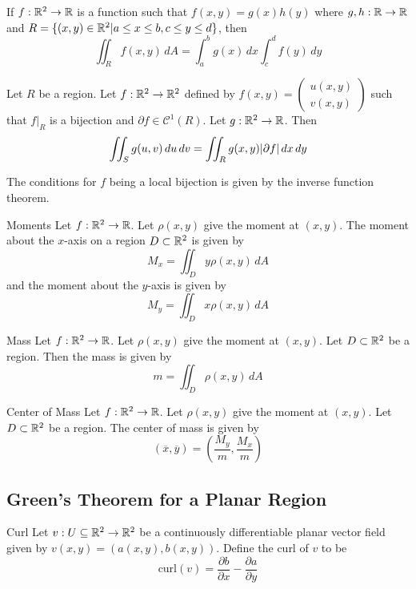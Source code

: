 \documentclass[a4paper]{article}
\begin{document}
\begin{prp}{}{} If $f:\mathbb{R}^2\to\mathbb{R}$ is a function such that $f(x,y)=g(x)h(y)$ where $g,h:\mathbb{R}\to\mathbb{R}$ and $R=\{(x,y)\in\mathbb{R}^2|a\leq x\leq b, c\leq y\leq d\}$, then $$\iint_Rf(x,y)\,dA=\int_a^bg(x)\,dx\int_c^df(y)\,dy$$
\end{prp}

\begin{thm}{}{} Let $R$ be a region. Let $f:\mathbb{R}^2\to\mathbb{R}^2$ defined by $f(x,y)=\begin{pmatrix}u(x,y)\\v(x,y)\end{pmatrix}$ such that $f|_R$ is a bijection and $\partial f\in\mathcal{C}^1(R)$. Let $g:\mathbb{R}^2\to\mathbb{R}$. Then $$\iint_Sg(u,v)\,du\,dv=\iint_Rg(x,y)\abs{\partial f}\,dx\,dy$$
\end{thm}

The conditions for $f$ being a local bijection is given by the inverse function theorem. 

\begin{thm}{Moments}{} Let $f:\mathbb{R}^2\to\mathbb{R}$. Let $\rho(x,y)$ give the moment at $(x,y)$. The moment about the $x$-axis on a region $D\subset\mathbb{R}^2$ is given by $$M_x=\iint_Dy\rho(x,y)\,dA$$ and the moment about the $y$-axis is given by $$M_y=\iint_Dx\rho(x,y)\,dA$$
\end{thm}

\begin{thm}{Mass}{} Let $f:\mathbb{R}^2\to\mathbb{R}$. Let $\rho(x,y)$ give the moment at $(x,y)$. Let $D\subset\mathbb{R}^2$ be a region. Then the mass is given by $$m=\iint_D\rho(x,y)\,dA$$
\end{thm}

\begin{thm}{Center of Mass}{} Let $f:\mathbb{R}^2\to\mathbb{R}$. Let $\rho(x,y)$ give the moment at $(x,y)$. Let $D\subset\mathbb{R}^2$ be a region. The center of mass is given by $$(\overline{x},\overline{y})=\left(\frac{M_y}{m},\frac{M_x}{m}\right)$$
\end{thm}

\subsection{Green's Theorem for a Planar Region}
\begin{defn}{Curl}{} Let $v:U\subseteq\mathbb{R}^2\to\mathbb{R}^2$ be a continuously differentiable planar vector field given by $v(x,y)=\left(a(x,y),b(x,y)\right)$. Define the curl of $v$ to be $$\text{curl}(v)=\frac{\partial b}{\partial x}-\frac{\partial a}{\partial y}$$
\end{defn}
\end{document}
